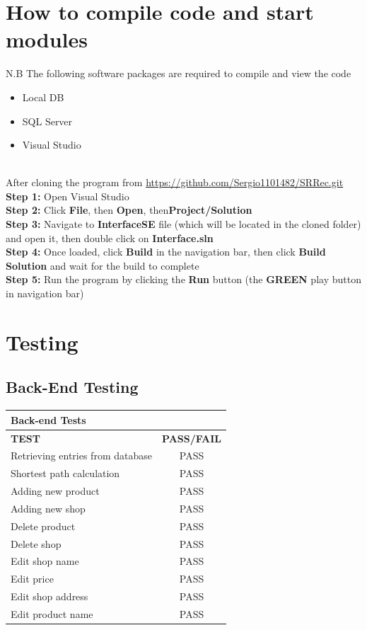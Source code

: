 \documentclass[12pt]{article}
\begin{document}
\section{How to compile code and start modules}
{\color{red} N.B The following software packages are required to compile and view the code
\begin{itemize}
\item Local DB
\item SQL Server
\item Visual Studio
\end{itemize}}
\hfill\\
After cloning the program from \url{https://github.com/Sergio1101482/SRRec.git}\\
\hfill
\textbf{Step 1:} Open Visual Studio\\
\textbf{Step 2:} Click \textbf{File}, then \textbf{Open}, then\textbf{Project/Solution}\\
\textbf{Step 3:} Navigate to \textbf{InterfaceSE} file (which will       be located in the cloned folder) and open it, then double click on \textbf{Interface.sln}\\
\textbf{Step 4:} Once loaded, click \textbf{Build} in the navigation bar, then click \textbf{Build Solution} and wait for the build to complete\\
\textbf{Step 5:} Run the program by clicking the \textbf{Run} button (the {\color{green} \textbf{GREEN}} play button in navigation bar)


\section{Testing}
\subsection{Back-End Testing}
\begin{center}
\begin{tabular}{| l | c |}
\hline  
\textbf{Back-end Tests} & \\ \hline
\textbf{TEST} & \textbf{PASS/FAIL} \\ \hline%
Retrieving entries from database & PASS\\ \hline
Shortest path calculation & PASS\\ \hline
Adding new product & PASS\\ \hline
Adding new shop & PASS\\ \hline
Delete product & PASS\\ \hline
Delete shop & PASS\\ \hline
Edit shop name & PASS\\ \hline
Edit price & PASS\\ \hline
Edit shop address & PASS\\ \hline
Edit product name & PASS\\ \hline
\end{tabular}
\end{center}
\end{document}
